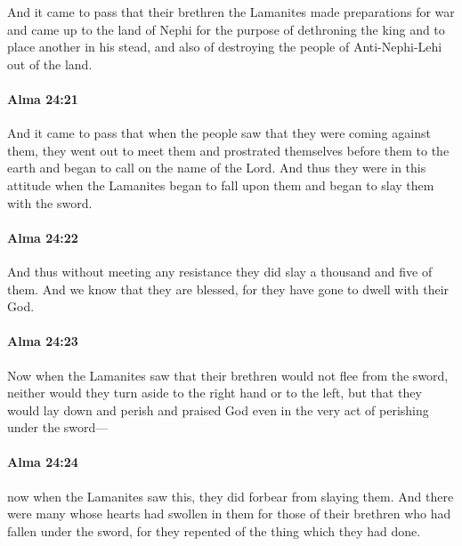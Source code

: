 			And it came to pass that their brethren the Lamanites made preparations for war
			and came up to the land of Nephi for the purpose of dethroning the king
			and to place another in his stead,
			and also of destroying the people of Anti-Nephi-Lehi out of the land.

		\paragraph{Alma 24:21} %
			\label{ALMA-24-21}

			And it came to pass that when the people saw that they were coming against them,
			they went out to meet them and prostrated themselves before them to the earth
			and began to call on the name of the Lord.
			And thus they were in this attitude
			when the Lamanites began to fall upon them
			and began to slay them with the sword.

		\paragraph{Alma 24:22} %
			\label{ALMA-24-22}

			And thus without meeting any resistance they did slay a thousand and five of them.
			And we know that they are blessed,
			for they have gone to dwell with their God.

		\paragraph{Alma 24:23} %
			\label{ALMA-24-23}

			Now when the Lamanites saw that their brethren would not flee from the sword,
			neither would they turn aside to the right hand or to the left,
			but that they would lay down and perish
			and praised God even in the very act of perishing under the sword---

		\paragraph{Alma 24:24} %
			\label{ALMA-24-24}

			now when the Lamanites saw this,
			they did forbear from slaying them.
			And there were many whose hearts had swollen in them
			for those of their brethren who had fallen under the sword,
			for they repented of the thing which they had done.

